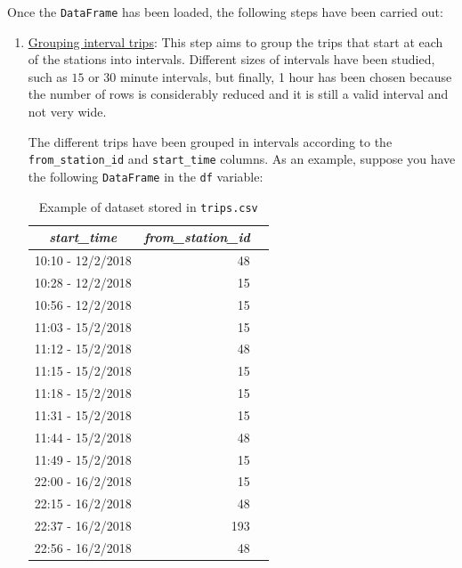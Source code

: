 Once the \small{\verb|DataFrame|} \normalsize  has been loaded, the following steps have been carried out:
\begin{enumerate}
    \item \underline{Grouping interval trips}: This step aims to group the trips that start at each of the stations into intervals. Different sizes of intervals have been studied, such as $15$ or $30$ minute intervals, but finally, 1 hour has been chosen because the number of rows is considerably reduced and it is still a valid interval and not very wide. 
    \newline
    
    The different trips have been grouped in intervals according to the \small{\verb|from_station_id|} \normalsize  and \small{\verb|start_time|} \normalsize  columns. As an example, suppose you have the following \small{\verb|DataFrame|} \normalsize  in the \small{\verb|df|} \normalsize  variable:

    \begin{table}[H]
    \footnotesize
    \centering
    \begin{tabular}{c|rr}
        \toprule
          \textit{start\_time} & \textit{from\_station\_id}  \\
        \midrule
        
        10:10 - 12/2/2018 & 48\\
        10:28 - 12/2/2018 & 15\\
        10:56 - 12/2/2018 & 15\\
        11:03 - 15/2/2018 & 15\\
        11:12 - 15/2/2018 & 48\\
        11:15 - 15/2/2018 & 15\\
        11:18 - 15/2/2018 & 15\\
        11:31 - 15/2/2018 & 15\\
        11:44 - 15/2/2018 & 48\\
        11:49 - 15/2/2018 & 15\\
        22:00 - 16/2/2018 & 15\\
        22:15 - 16/2/2018 & 48\\
        22:37 - 16/2/2018 & 193\\
        22:56 - 16/2/2018 & 48\\
        \bottomrule
        
    \end{tabular}
    \cprotect\caption{Example of dataset stored in \small{\verb|trips.csv|} \normalsize }
    \label{tab:starttime_withsid}
    \end{table}
    

\end{enumerate}
